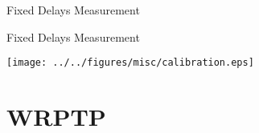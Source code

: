 \documentclass[compress,red]{beamer}
\begin{document}
\logo{}
\begin{frame}{Fixed Delays Measurement}


\end{frame}
\begin{frame}{Fixed Delays Measurement}

  \begin{center}
  \texttt{[image: ../../figures/misc/calibration.eps]}
  \end{center}

\end{frame}
\section{WRPTP}
\end{document}
